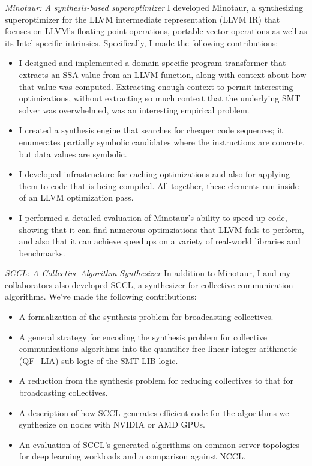 \emph{Minotaur: A synthesis-based superoptimizer} I developed
Minotaur, a synthesizing superoptimizer for the LLVM intermediate
representation (LLVM IR) that focuses on LLVM's floating point
operations, portable vector operations as well as its Intel-specific
intrinsics. Specifically, I made the following contributions:

\begin{itemize}
    \item I designed and implemented a domain-specific program
    transformer that extracts an SSA value from an LLVM function,
    along with context about how that value was computed.
    Extracting enough context to permit interesting optimizations,
    without extracting so much context that the underlying SMT
    solver was overwhelmed, was an interesting empirical problem.

    \item I created a synthesis engine that searches for cheaper code
    sequences; it enumerates partially symbolic candidates where the
    instructions are concrete, but data values are symbolic.
    \item I developed infrastructure for caching optimizations and also
    for applying them to code that is being compiled.
    All together, these elements run inside of an LLVM optimization pass.
    \item I performed a detailed evaluation of Minotaur's ability to
    speed up code, showing that it can find numerous optimziations that
    LLVM fails to perform, and also that it can achieve speedups on a
    variety of real-world libraries and benchmarks.
\end{itemize}

\emph{SCCL: A Collective Algorithm Synthesizer} In addition to
Minotaur, I and my collaborators also developed SCCL, a synthesizer
for collective communication algorithms. We've made the following
contributions:

\begin{itemize}
\item A formalization of the synthesis problem for broadcasting
collectives.

\item A general strategy for encoding the synthesis problem for
collective communications algorithms into the quantifier-free linear
integer arithmetic (QF\_LIA) sub-logic of the SMT-LIB logic.

\item A reduction from the synthesis problem for reducing collectives
to that for broadcasting collectives.

\item A description of how SCCL generates efficient code for the
algorithms we synthesize on nodes with NVIDIA or AMD GPUs.

\item An evaluation of SCCL's generated algorithms on common server
topologies for deep learning workloads and a comparison against NCCL.

\end{itemize}


